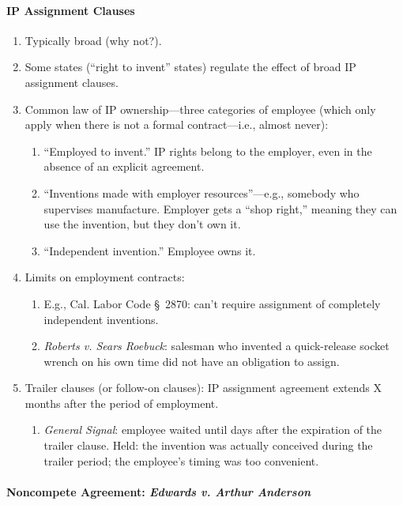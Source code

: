 \paragraph{IP Assignment Clauses}

\begin{enumerate}
    \item Typically broad (why not?).
    \item Some states (``right to invent'' states) regulate the effect of 
    broad IP assignment clauses.
    \item Common law of IP ownership---three categories of employee (which 
    only apply when there is not a formal contract---i.e., almost never):
    \begin{enumerate}
        \item ``Employed to invent.'' IP rights belong to the employer, even 
        in the absence of an explicit agreement.
        \item ``Inventions made with employer resources''---e.g., somebody who 
        supervises manufacture. Employer gets a ``shop right,'' meaning they 
        can use the invention, but they don't own it.
        \item ``Independent invention.'' Employee owns it.
    \end{enumerate}
    \item Limits on employment contracts:
    \begin{enumerate}
        \item E.g., Cal. Labor Code \S\ 2870: can't require assignment of 
        completely independent inventions.
        \item \emph{Roberts v. Sears Roebuck}: salesman who invented a 
        quick-release socket wrench on his own time did not have an obligation 
        to assign.
    \end{enumerate}
    \item Trailer clauses (or follow-on clauses): IP assignment agreement 
    extends X months after the period of employment.
    \begin{enumerate}
        \item \emph{General Signal}: employee waited until days after the 
        expiration of the trailer clause. Held: the invention was actually 
        conceived during the trailer period; the employee's timing was too 
        convenient.
    \end{enumerate}
\end{enumerate}

\paragraph{Noncompete Agreement: \emph{Edwards v. Arthur Anderson}}

